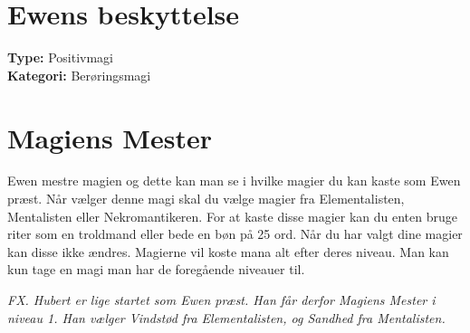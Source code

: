 \section{Ewens beskyttelse}
\textbf{Type:} Positivmagi\\
\textbf{Kategori:} Berøringsmagi\\

\section{Magiens Mester}
Ewen mestre magien og dette kan man se i hvilke magier du kan kaste som Ewen præst. Når vælger denne magi skal du vælge magier fra Elementalisten, Mentalisten eller Nekromantikeren. For at kaste disse magier kan du enten bruge riter som en troldmand eller bede en bøn på 25 ord. Når du har valgt dine magier kan disse ikke ændres. Magierne vil koste mana alt efter deres niveau. Man kan kun tage en magi man har de foregående niveauer til.

\textit{FX. Hubert er lige startet som Ewen præst. Han får derfor Magiens Mester i niveau 1. Han vælger Vindstød fra Elementalisten, og Sandhed fra Mentalisten.}

